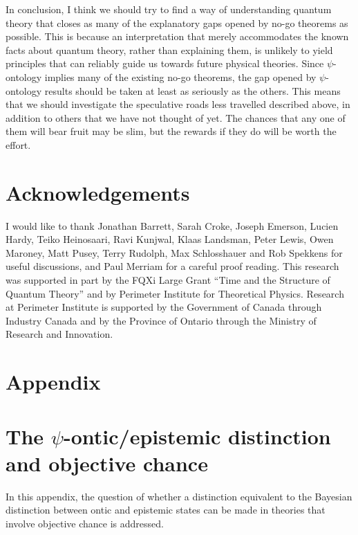 \documentclass[DIV=calc,paper=a4,fontsize=11pt,twocolumn]{scrartcl} %
\theoremstyle{definition}
\theoremstyle{plain}
\begin{document}
In conclusion, I think we should try to find a way of understanding
quantum theory that closes as many of the explanatory gaps opened by
no-go theorems as possible.  This is because an interpretation that
merely accommodates the known facts about quantum theory, rather than
explaining them, is unlikely to yield principles that can reliably
guide us towards future physical theories.  Since $\psi$-ontology
implies many of the existing no-go theorems, the gap opened by
$\psi$-ontology results should be taken at least as seriously as the
others.  This means that we should investigate the speculative roads
less travelled described above, in addition to others that we have not
thought of yet.  The chances that any one of them will bear fruit may
be slim, but the rewards if they do will be worth the effort.

\section*{Acknowledgements}

I would like to thank Jonathan Barrett, Sarah Croke, Joseph Emerson,
Lucien Hardy, Teiko Heinosaari, Ravi Kunjwal, Klaas Landsman, Peter
Lewis, Owen Maroney, Matt Pusey, Terry Rudolph, Max Schlosshauer and
Rob Spekkens for useful discussions, and Paul Merriam for a careful
proof reading.  This research was supported in part by the FQXi Large
Grant ``Time and the Structure of Quantum Theory'' and by Perimeter
Institute for Theoretical Physics.  Research at Perimeter Institute is
supported by the Government of Canada through Industry Canada and by
the Province of Ontario through the Ministry of Research and
Innovation.

\section*{Appendix}
\appendix

\section{The $\psi$-ontic/epistemic distinction and objective chance}

\label{App:Chance}

In this appendix, the question of whether a distinction equivalent to
the Bayesian distinction between ontic and epistemic states can be
made in theories that involve objective chance is addressed.
\end{document}
